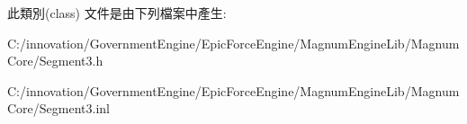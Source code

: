 此類別(class) 文件是由下列檔案中產生\+:\begin{DoxyCompactItemize}
\item 
C\+:/innovation/\+Government\+Engine/\+Epic\+Force\+Engine/\+Magnum\+Engine\+Lib/\+Magnum\+Core/Segment3.\+h\item 
C\+:/innovation/\+Government\+Engine/\+Epic\+Force\+Engine/\+Magnum\+Engine\+Lib/\+Magnum\+Core/Segment3.\+inl\end{DoxyCompactItemize}
